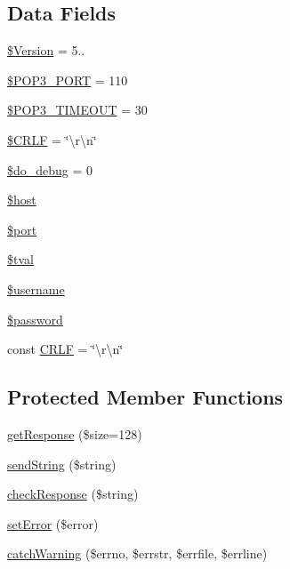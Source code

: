 \subsection*{Data Fields}
\begin{DoxyCompactItemize}
\item 
\hyperlink{class_p_o_p3_a8a43e1c8b245951155d04b279276af95}{\$\+Version} = \textquotesingle{}5..\textquotesingle{}
\item 
\hyperlink{class_p_o_p3_a1b5e612c53a85355ca0a5ef5121becfb}{\$\+P\+O\+P3\+\_\+\+P\+O\+RT} = 110
\item 
\hyperlink{class_p_o_p3_a5a68cb992276c956e16214f08e62ce3a}{\$\+P\+O\+P3\+\_\+\+T\+I\+M\+E\+O\+UT} = 30
\item 
\hyperlink{class_p_o_p3_a75538b15bafd1ec1eaaa6ea0bbfa642a}{\$\+C\+R\+LF} = \char`\"{}\textbackslash{}r\textbackslash{}n\char`\"{}
\item 
\hyperlink{class_p_o_p3_a09ca59ee83fba6c8137646a13f1664d1}{\$do\+\_\+debug} = 0
\item 
\hyperlink{class_p_o_p3_a711797613cb863ca0756df789c396bf2}{\$host}
\item 
\hyperlink{class_p_o_p3_aa0787efab4b22e8a212882f3409d4c77}{\$port}
\item 
\hyperlink{class_p_o_p3_a19650abd43de047c5f64c5a1a84e4533}{\$tval}
\item 
\hyperlink{class_p_o_p3_a0eb82aa5f81cf845de4b36cd653c42cf}{\$username}
\item 
\hyperlink{class_p_o_p3_a607686ef9f99ea7c42f4f3dd3dbb2b0d}{\$password}
\item 
const \hyperlink{class_p_o_p3_aa8bdd4d85e1ba0db8c09f92688c27ca6}{C\+R\+LF} = \char`\"{}\textbackslash{}r\textbackslash{}n\char`\"{}
\end{DoxyCompactItemize}
\subsection*{Protected Member Functions}
\begin{DoxyCompactItemize}
\item 
\hyperlink{class_p_o_p3_a036e1e5d5d4f9b5b0dd72bf9a2b8295d}{get\+Response} (\$size=128)
\item 
\hyperlink{class_p_o_p3_a517133fc963d79977f1eae330e14e0d1}{send\+String} (\$string)
\item 
\hyperlink{class_p_o_p3_a04047b99bcd87ed0d2222bbf2116ff79}{check\+Response} (\$string)
\item 
\hyperlink{class_p_o_p3_a0bc8cac7e04a83c9ca87a99690ef1194}{set\+Error} (\$error)
\item 
\hyperlink{class_p_o_p3_a9a1c6d7d5abe85e004d8546e30933d94}{catch\+Warning} (\$errno, \$errstr, \$errfile, \$errline)
\end{DoxyCompactItemize}
